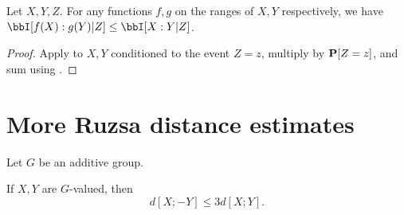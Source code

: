 \begin{lemma}\label{data-process}\leanok Let $X,Y,Z$. For any functions $f, g$
on the ranges of $X, Y$ respectively, we have $\bbI[f(X) : g(Y )|Z] \leq \bbI[X :Y |Z]$.
\end{lemma}

\begin{proof}\leanok  Apply  to $X,Y$ conditioned to the event $Z=z$, multiply by ${\bf P}[Z=z]$, and sum using .
\end{proof}

\section{More Ruzsa distance estimates}

Let $G$ be an additive group.

\begin{lemma}\label{sign-flip}\leanok
  If $X,Y$ are $G$-valued, then
  $$  d[X ; -Y]  \leq 3 d[X;Y].$$
\end{lemma}


